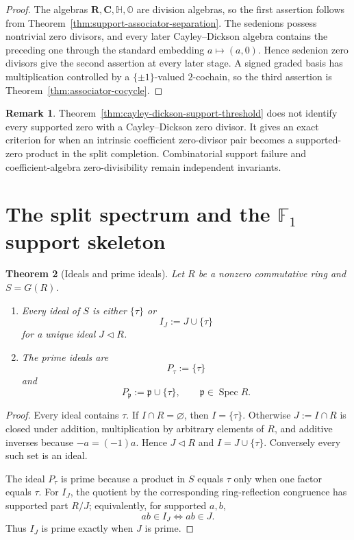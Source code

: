 \documentclass[11pt]{amsart}
\numberwithin{equation}{section}
\newtheorem{theorem}{Theorem}[section]
\theoremstyle{definition}
\newtheorem{remark}[theorem]{Remark}
\newcommand{\R}{\mathbf R}
\newcommand{\C}{\mathbf C}
\newcommand{\Spec}{\operatorname{Spec}}
\begin{document}
\begin{proof}
The algebras $\R,\C,\mathbb H,\mathbb O$ are division algebras, so the
first assertion follows from
Theorem~\ref{thm:support-associator-separation}.  The sedenions possess
nontrivial zero divisors, and every later Cayley--Dickson algebra contains
the preceding one through the standard embedding $a\mapsto(a,0)$.  Hence
sedenion zero divisors give the second assertion at every later stage.
A signed graded basis has multiplication controlled by a
$\{\pm1\}$-valued $2$-cochain, so the third assertion is
Theorem~\ref{thm:associator-cocycle}.
\end{proof}

\begin{remark}
Theorem~\ref{thm:cayley-dickson-support-threshold} does not identify every
supported zero with a Cayley--Dickson zero divisor.  It gives an exact
criterion for when an intrinsic coefficient zero-divisor pair becomes a
supported-zero product in the split completion.  Combinatorial support
failure and coefficient-algebra zero-divisibility remain independent
invariants.
\end{remark}

\section{The split spectrum and the \texorpdfstring{$\mathbb F_1$}{F1} support skeleton}

\begin{theorem}[Ideals and prime ideals]\label{thm:prime-classification}
Let $R$ be a nonzero commutative ring and $S=G(R)$.
\begin{enumerate}[label=\textup{(\alph*)}]
\item Every ideal of $S$ is either $\{\tau\}$ or
\[
I_J:=J\cup\{\tau\}
\]
for a unique ideal $J\triangleleft R$.
\item The prime ideals are
\[
P_\tau:=\{\tau\}
\]
and
\[
P_{\mathfrak p}:=\mathfrak p\cup\{\tau\},
\qquad
\mathfrak p\in\Spec R.
\]
\end{enumerate}
\end{theorem}

\begin{proof}
Every ideal contains $\tau$.  If $I\cap R=\varnothing$, then $I=\{\tau\}$.  Otherwise $J:=I\cap R$ is closed under addition, multiplication by arbitrary elements of $R$, and additive inverses because $-a=(-1)a$.  Hence $J\triangleleft R$ and $I=J\cup\{\tau\}$.  Conversely every such set is an ideal.

The ideal $P_\tau$ is prime because a product in $S$ equals $\tau$ only when one factor equals $\tau$.  For $I_J$, the quotient by the corresponding ring-reflection congruence has supported part $R/J$; equivalently, for supported $a,b$,
\[
ab\in I_J
\iff
ab\in J.
\]
Thus $I_J$ is prime exactly when $J$ is prime.
\end{proof}
\end{document}
